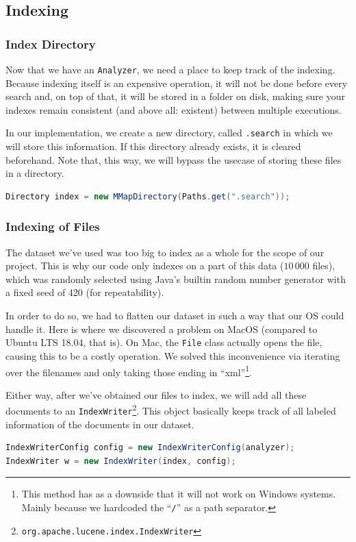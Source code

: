 \documentclass[11pt]{article}
\begin{document}
\subsection{Indexing}\label{sec:indexing}
\subsubsection{Index Directory}
Now that we have an \texttt{Analyzer}, we need a place to keep track of the indexing. Because indexing itself is an expensive operation, it will not be done before every search and, on top of that, it will be stored in a folder on disk, making sure your indexes remain consistent (and above all: existent) between multiple executions.

In our implementation, we create a new directory, called \texttt{.search} in which we will store this information. If this directory already exists, it is cleared beforehand. Note that, this way, we will bypass the usecase of storing these files in a directory.
\begin{lstlisting}[language=Java]
Directory index = new MMapDirectory(Paths.get(".search"));
\end{lstlisting}

\subsubsection{Indexing of Files}\label{sec:indexfiles}
The dataset we've used was too big to index as a whole for the scope of our project. This is why our code only indexes on a part of this data ($10\,000$ files), which was randomly selected using Java's builtin random number generator with a fixed seed of 420 (for repeatability).

In order to do so, we had to flatten our dataset in such a way that our OS could handle it. Here is where we discovered a problem on MacOS (compared to Ubuntu LTS 18.04, that is). On Mac, the \texttt{File} class actually opens the file, causing this to be a costly operation. We solved this inconvenience via iterating over the filenames and only taking those ending in ``xml''\footnote{This method has as a downside that it will not work on Windows systems. Mainly because we hardcoded the ``\texttt{/}'' as a path separator.}.

Either way, after we've obtained our files to index, we will add all these documents to an \texttt{IndexWriter}\footnote{\texttt{org.apache.lucene.index.IndexWriter}}. This object basically keeps track of all labeled information of the documents in our dataset.
\begin{lstlisting}[language=Java]
IndexWriterConfig config = new IndexWriterConfig(analyzer);
IndexWriter w = new IndexWriter(index, config);
\end{lstlisting}
\end{document}
